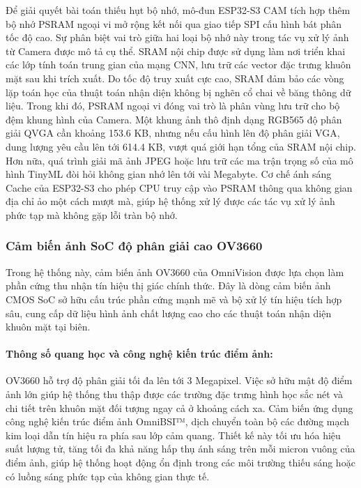 Để giải quyết bài toán thiếu hụt bộ nhớ, mô-đun ESP32-S3 CAM tích hợp thêm bộ nhớ PSRAM ngoại vi mở rộng kết nối qua giao tiếp SPI cấu hình bát phân tốc độ cao. Sự phân biệt vai trò giữa hai loại bộ nhớ này trong tác vụ xử lý ảnh từ Camera được mô tả cụ thể. SRAM nội chip được sử dụng làm nơi triển khai các lớp tính toán trung gian của mạng CNN, lưu trữ các vector đặc trưng khuôn mặt sau khi trích xuất. Do tốc độ truy xuất cực cao, SRAM đảm bảo các vòng lặp toán học của thuật toán nhận diện không bị nghẽn cổ chai về băng thông dữ liệu. Trong khi đó, PSRAM ngoại vi đóng vai trò là phân vùng lưu trữ cho bộ đệm khung hình của Camera. Một khung ảnh thô định dạng RGB565 độ phân giải QVGA cần khoảng 153.6 KB, nhưng nếu cấu hình lên độ phân giải VGA, dung lượng yêu cầu lên tới 614.4 KB, vượt quá giới hạn tổng của SRAM nội chip. Hơn nữa, quá trình giải mã ảnh JPEG hoặc lưu trữ các ma trận trọng số của mô hình TinyML đòi hỏi không gian nhớ lên tới vài Megabyte. Cơ chế ánh sáng Cache của ESP32-S3 cho phép CPU truy cập vào PSRAM thông qua không gian địa chỉ ảo một cách mượt mà, giúp hệ thống xử lý được các tác vụ xử lý ảnh phức tạp mà không gặp lỗi tràn bộ nhớ.

\subsubsection{Cảm biến ảnh SoC độ phân giải cao OV3660}

Trong hệ thống này, cảm biến ảnh OV3660 của OmniVision được lựa chọn làm phần cứng thu nhận tín hiệu thị giác chính thức. Đây là dòng cảm biến ảnh CMOS SoC sở hữu cấu trúc phần cứng mạnh mẽ và bộ xử lý tín hiệu tích hợp sâu, cung cấp dữ liệu hình ảnh chất lượng cao cho các thuật toán nhận diện khuôn mặt tại biên.

\paragraph{Thông số quang học và công nghệ kiến trúc điểm ảnh:}
OV3660 hỗ trợ độ phân giải tối đa lên tới 3 Megapixel. Việc sở hữu mật độ điểm ảnh lớn giúp hệ thống thu thập được các trường đặc trưng hình học sắc nét và chi tiết trên khuôn mặt đối tượng ngay cả ở khoảng cách xa. Cảm biến ứng dụng công nghệ kiến trúc điểm ảnh OmniBSI™, dịch chuyển toàn bộ các đường mạch kim loại dẫn tín hiệu ra phía sau lớp cảm quang. Thiết kế này tối ưu hóa hiệu suất lượng tử, tăng tối đa khả năng hấp thụ ánh sáng trên mỗi micron vuông của điểm ảnh, giúp hệ thống hoạt động ổn định trong các môi trường thiếu sáng hoặc có luồng sáng phức tạp của không gian thực tế.

